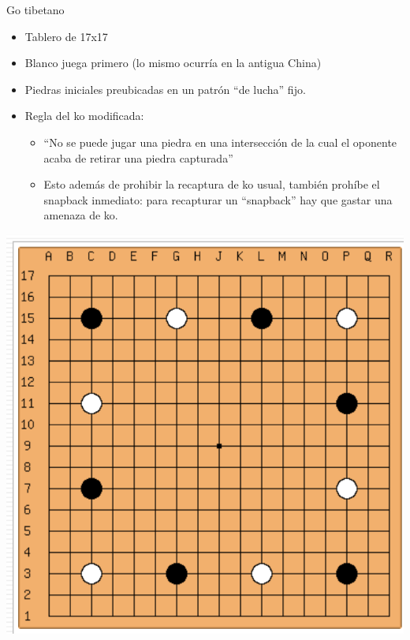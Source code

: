 \documentclass{beamer}
\begin{document}
\begin{frame}{Go tibetano}
\footnotesize
    \begin{itemize}
        \item Tablero de 17x17
        \item Blanco juega primero (lo mismo ocurría en la antigua China)
        \item Piedras iniciales preubicadas en un patrón ``de lucha'' fijo.
        \item Regla del ko modificada: 
            \begin{itemize}
            \footnotesize
              \item ``No se puede jugar una piedra en una intersección de la cual el oponente acaba de retirar una piedra capturada''
              \item Esto además de prohibir la recaptura de ko usual, también prohíbe el snapback inmediato: para recapturar un ``snapback'' hay que gastar una amenaza de ko.
            \end{itemize}
    \end{itemize}
    
    \vspace{-0.1cm}
    {\hfill \includegraphics[scale=0.17]{go-tibetano.png} \hfill}
    
\end{frame}
\end{document}
